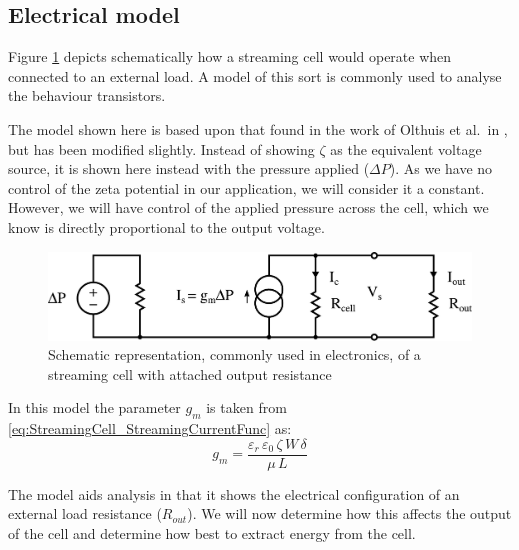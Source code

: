 


\subsection{\label{sub:Electrical-model}Electrical model}

Figure \ref{fig:StreamingCell_Schematic-representation} depicts schematically how a streaming cell would operate when connected to an external load.
A model of this sort is commonly used to analyse the behaviour transistors.

The model shown here is based upon that found in the work of Olthuis et al.\ in \cite{Olthuis2005}, but has been modified slightly.
Instead of showing $\zeta$ as the equivalent voltage source, it is shown here instead with the pressure applied ($\Delta P$).
As we have no control of the zeta potential in our application, we will consider it a constant.
However, we will have control of the applied pressure across the cell, which we know is directly proportional to the output voltage.

\begin{figure}
    \centering
        \includegraphics[width=\textwidth]{content/pt1/01-PowerHarvesting/graphics/StreamingCell_EquivalentCircuit_output}
    \caption{\label{fig:StreamingCell_Schematic-representation}Schematic representation, commonly used in electronics, of a streaming cell with attached output resistance}
\end{figure}
In this model the parameter $g_{m}$ is taken from \cref{eq:StreamingCell_StreamingCurrentFunc} as:
\begin{equation}
    g_{m} = \frac{\varepsilon_{r}\,\varepsilon_{0}\,\zeta\,W\,\delta}{\mu\,L}
\end{equation}

The model aids analysis in that it shows the electrical configuration of an external load resistance ($R_{out}$).
We will now determine how this affects the output of the cell and determine how best to extract energy from the cell.

